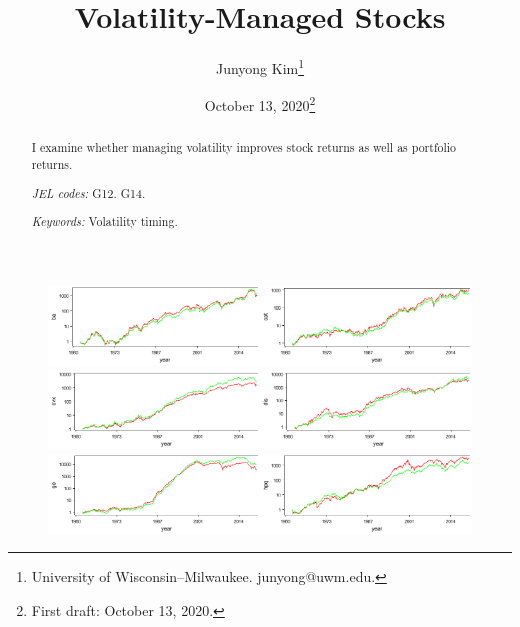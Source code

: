 \documentclass{article}
\title{Volatility-Managed Stocks}
\author{Junyong Kim\footnote{University of Wisconsin--Milwaukee. junyong@uwm.edu.}}
\date{October 13, 2020\footnote{First draft: October 13, 2020.}}
\begin{document}
\maketitle

\begin{abstract}

I examine whether managing volatility improves stock returns as well as portfolio returns.

\smallskip

\textit{JEL codes:} G12. G14.

\textit{Keywords:} Volatility timing.

\end{abstract}



\clearpage

\begin{figure}
\centering
\includegraphics[width=0.5\textwidth]{_ba}\includegraphics[width=0.5\textwidth]{_cat}
\includegraphics[width=0.5\textwidth]{_cvx}\includegraphics[width=0.5\textwidth]{_dis}
\includegraphics[width=0.5\textwidth]{_ge}\includegraphics[width=0.5\textwidth]{_hpq}

\end{figure}
\end{document}
